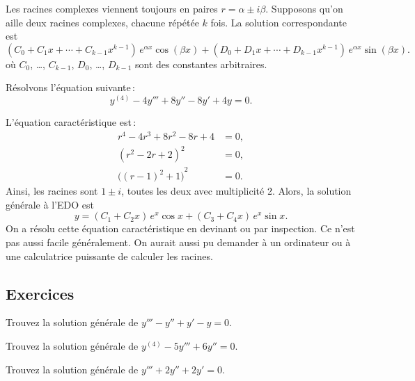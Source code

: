 Les racines complexes viennent toujours en paires 
$r = \alpha \pm i \beta$.  Supposons qu'on aille deux racines complexes, chacune répétée $k$ fois.
La solution correspondante est 
\begin{equation*}
( C_0 + C_1 x + \cdots + C_{k-1} x^{k-1} ) \, e^{\alpha x} \cos (\beta x)
+
( D_0 + D_1 x + \cdots + D_{k-1} x^{k-1} ) \, e^{\alpha x} \sin (\beta x) .
\end{equation*}
où $C_0$, \ldots, $C_{k-1}$, $D_0$, \ldots, $D_{k-1}$ sont des constantes arbitraires. 

\begin{example}
Résolvons l'équation suivante\,: 
\begin{equation*}
y^{(4)} - 4 y''' + 8 y'' - 8 y' + 4y = 0 .
\end{equation*}

L'équation caractéristique est\,: 
\begin{align*}
r^4 - 4 r^3 + 8 r^2 - 8 r + 4 & = 0 , \\
{(r^2-2r+2)}^2 & = 0 , \\
{\bigl({(r-1)}^2+1\bigr)}^2 & = 0 .
\end{align*}
Ainsi, les racines sont  $1 \pm i$, toutes les deux avec multiplicité 2. Alors, la solution générale à l'EDO est  
\begin{equation*}
y = 
( C_1 + C_2 x ) \, e^{x} \cos x
+
( C_3 + C_4 x ) \, e^{x} \sin x .
\end{equation*}
On a résolu cette équation caractéristique en devinant ou par inspection. Ce n'est pas aussi facile généralement. On aurait aussi pu demander à un ordinateur ou à une calculatrice puissante de calculer les racines. 
\end{example}


\subsection{Exercices}

\begin{exercise}
Trouvez la solution générale de $y''' - y'' + y' - y = 0$.
\end{exercise}

\begin{exercise}
Trouvez la solution générale de $y^{(4)} - 5 y''' + 6 y'' = 0$.
\end{exercise}

\begin{exercise}
Trouvez la solution générale de $y''' + 2 y'' + 2 y' = 0$.
\end{exercise}

